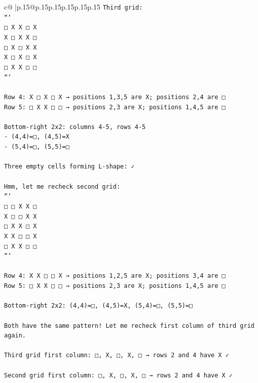 \documentclass{article}
\begin{document}
{\begin{supertabular}{c@{$\;$}|p{.15\linewidth}@{}p{.15\linewidth}p{.15\linewidth}p{.15\linewidth}p{.15\linewidth}p{.15\linewidth}}
{{{\texttt{Third grid:} \\
\texttt{```} \\
\texttt{□ X X □ X} \\
\texttt{X □ X X □} \\
\texttt{□ X □ X X} \\
\texttt{X □ X □ X} \\
\texttt{□ X X □ □} \\
\texttt{```} \\
\\ 
\texttt{Row 4: X □ X □ X → positions 1,3,5 are X; positions 2,4 are □} \\
\texttt{Row 5: □ X X □ □ → positions 2,3 are X; positions 1,4,5 are □} \\
\\ 
\texttt{Bottom{-}right 2x2: columns 4{-}5, rows 4{-}5} \\
\texttt{{-} (4,4)=□, (4,5)=X} \\
\texttt{{-} (5,4)=□, (5,5)=□} \\
\\ 
\texttt{Three empty cells forming L{-}shape: ✓} \\
\\ 
\texttt{Hmm, let me recheck second grid:} \\
\texttt{```} \\
\texttt{□ □ X X □} \\
\texttt{X □ □ X X} \\
\texttt{□ X X □ X} \\
\texttt{X X □ □ X} \\
\texttt{□ X X □ □} \\
\texttt{```} \\
\\ 
\texttt{Row 4: X X □ □ X → positions 1,2,5 are X; positions 3,4 are □} \\
\texttt{Row 5: □ X X □ □ → positions 2,3 are X; positions 1,4,5 are □} \\
\\ 
\texttt{Bottom{-}right 2x2: (4,4)=□, (4,5)=X, (5,4)=□, (5,5)=□} \\
\\ 
\texttt{Both have the same pattern! Let me recheck first column of third grid again.} \\
\\ 
\texttt{Third grid first column: □, X, □, X, □ → rows 2 and 4 have X ✓} \\
\\ 
\texttt{Second grid first column: □, X, □, X, □ → rows 2 and 4 have X ✓} \\
}}}
\end{supertabular}}
\end{document}

